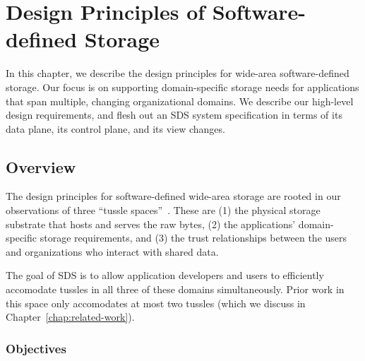 \chapter{Design Principles of Software-defined Storage}
\label{chap:design_principles}

In this chapter, we describe the design principles for wide-area
software-defined storage.  Our focus is on supporting domain-specific storage
needs for applications that span multiple, changing
organizational domains.  We describe our high-level design requirements,
and flesh out an SDS system specification in terms of its data plane, its
control plane, and its view changes.

\section{Overview}

The design principles for software-defined wide-area storage are rooted in 
our observations of three ``tussle spaces''~\cite{david-clark-tussle-spaces}.
These are (1) the physical storage substrate that hosts and serves the raw
bytes, (2) the applications' domain-specific storage requirements, and (3) the trust
relationships between the users and organizations who interact with shared
data.

The goal of SDS is to allow application developers and users to efficiently accomodate tussles
in all three of these domains simultaneously.  Prior work in this space
only accomodates at most two tussles (which we discuss in
Chapter~\ref{chap:related-work}).

\subsection{Objectives}

